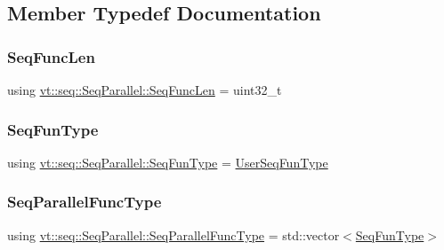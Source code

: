\subsection{Member Typedef Documentation}
\mbox{\label{structvt_1_1seq_1_1_seq_parallel_ab6a1d3fc6dbc5210e559c96f57f64e79}} 
\subsubsection{\texorpdfstring{Seq\+Func\+Len}{SeqFuncLen}}
{\footnotesize\ttfamily using \hyperlink{structvt_1_1seq_1_1_seq_parallel_ab6a1d3fc6dbc5210e559c96f57f64e79}{vt\+::seq\+::\+Seq\+Parallel\+::\+Seq\+Func\+Len} =  uint32\+\_\+t}

\mbox{\label{structvt_1_1seq_1_1_seq_parallel_ad113b4ac8767561a01332867ed6406c7}} 
\subsubsection{\texorpdfstring{Seq\+Fun\+Type}{SeqFunType}}
{\footnotesize\ttfamily using \hyperlink{structvt_1_1seq_1_1_seq_parallel_ad113b4ac8767561a01332867ed6406c7}{vt\+::seq\+::\+Seq\+Parallel\+::\+Seq\+Fun\+Type} =  \hyperlink{namespacevt_1_1seq_aeb4674d25dcb5d27248b68ec83fad2b6}{User\+Seq\+Fun\+Type}}

\mbox{\label{structvt_1_1seq_1_1_seq_parallel_a5804979becb9986676dcba10487eb8de}} 
\subsubsection{\texorpdfstring{Seq\+Parallel\+Func\+Type}{SeqParallelFuncType}}
{\footnotesize\ttfamily using \hyperlink{structvt_1_1seq_1_1_seq_parallel_a5804979becb9986676dcba10487eb8de}{vt\+::seq\+::\+Seq\+Parallel\+::\+Seq\+Parallel\+Func\+Type} =  std\+::vector$<$\hyperlink{structvt_1_1seq_1_1_seq_parallel_ad113b4ac8767561a01332867ed6406c7}{Seq\+Fun\+Type}$>$}



